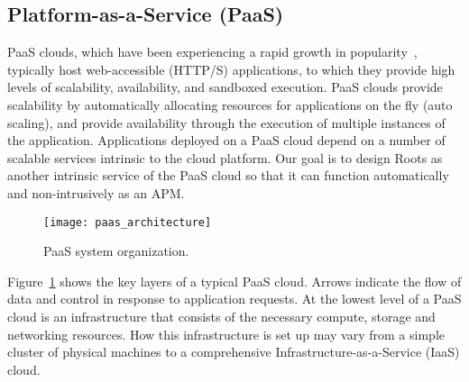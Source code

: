 \subsection{Platform-as-a-Service (PaaS)}

PaaS clouds, which have been experiencing a rapid growth in 
popularity~\cite{paas-growth,paas-growth2},
typically host web-accessible (HTTP/S) applications, to which they provide
high levels of scalability, availability, and sandboxed execution. PaaS
clouds provide scalability by automatically allocating resources for
applications on the fly (auto scaling), and provide availability through the
execution of multiple instances of the application. Applications deployed on
a PaaS cloud depend on a number of scalable services intrinsic to the 
cloud platform. Our goal is to design Roots as another intrinsic service of the PaaS cloud
so that it can function automatically and non-intrusively as an APM.

\begin{figure}
\centering
\texttt{[image: paas\_architecture]}
\caption{PaaS system organization.}
\label{fig:paas_architecture}
\end{figure}

Figure~\ref{fig:paas_architecture} shows the key layers of a typical PaaS cloud. Arrows indicate
the flow of data and control in response to application requests.
At the lowest level of a PaaS cloud is an infrastructure that consists of the necessary compute, storage
and networking resources. How this infrastructure is set up may vary from a simple cluster of physical 
machines to a comprehensive Infrastructure-as-a-Service (IaaS) cloud. 

